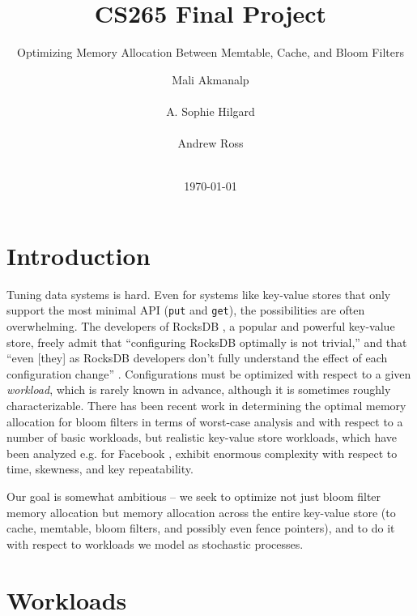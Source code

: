 \documentclass{sig-alternate-05-2015}
\begin{document}
\title{CS265 Final Project}
\subtitle{Optimizing Memory Allocation Between Memtable, Cache, and Bloom Filters}
\author{
\alignauthor
Mali Akmanalp\\
       \\
\alignauthor
A. Sophie Hilgard\\
       \\
\alignauthor Andrew Ross\\
       \\
       }

\date{\today}

\maketitle

\section{Introduction}
Tuning data systems is hard. Even for systems like key-value stores that only
support the most minimal API (\texttt{put} and \texttt{get}), the possibilities
are often overwhelming. The developers of RocksDB \cite{facebook:rocksdb}, a
popular and powerful key-value store, freely admit that ``configuring RocksDB
optimally is not trivial,'' and that ``even [they] as RocksDB developers don't
fully understand the effect of each configuration change''
\cite{rocksdb-tuning-guide}. Configurations must be optimized with respect to a
given \textit{workload}, which is rarely known in advance, although it is
sometimes roughly characterizable. There has been recent work \cite{monkey} in
determining the optimal memory allocation for bloom filters in terms of
worst-case analysis and with respect to a number of basic workloads, but
realistic key-value store workloads, which have been analyzed e.g. for Facebook
\cite{characterizing-memcached}, exhibit enormous complexity with respect to
time, skewness, and key repeatability.

Our goal is somewhat ambitious -- we seek to optimize not just bloom filter
memory allocation but memory allocation across the entire key-value store (to
cache, memtable, bloom filters, and possibly even fence pointers), and to do it
with respect to workloads we model as stochastic processes.

\section{Workloads}
\end{document}
